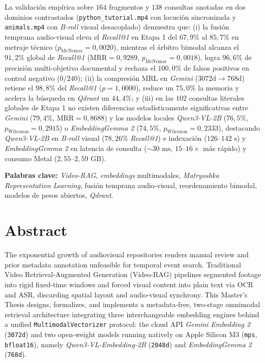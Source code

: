La validación empírica sobre $164$ fragmentos y $138$ consultas anotadas en dos dominios contrastados (\texttt{python\_tutorial.mp4} con locución sincronizada y \texttt{animals.mp4} con \textit{B-roll} visual desacoplado) demuestra que: (i) la fusión temprana audio-visual eleva el \textit{Recall@1} en Etapa 1 del $67,9\%$ al $85,7\%$ en metraje técnico ($p_{\text{McNemar}} = 0,0020$), mientras el árbitro bimodal alcanza el $91,2\%$ global de \textit{Recall@1} ($\text{MRR} = 0,9289$, $p_{\text{McNemar}} = 0,0018$), logra $96,6\%$ de precisión multi-objetivo documental y rechaza el $100,0\%$ de falsos positivos en control negativo ($0/240$); (ii) la compresión MRL en \textit{Gemini} ($3072\text{d} \to 768\text{d}$) retiene el $98,8\%$ del \textit{Recall@1} ($p = 1,0000$), reduce un $75,0\%$ la memoria y acelera la búsqueda en \textit{Qdrant} un $44,4\%$; y (iii) en las $102$ consultas literales globales de Etapa 1 no existen diferencias estadísticamente significativas entre \textit{Gemini} ($79,4\%$, $\text{MRR} = 0,8688$) y los modelos locales \textit{Qwen3-VL-2B} ($76,5\%$, $p_{\text{Wilcoxon}} = 0,2915$) o \textit{EmbeddingGemma 2} ($74,5\%$, $p_{\text{Wilcoxon}} = 0,2333$), destacando \textit{Qwen3-VL-2B} en \textit{B-roll} visual ($78,26\%$ \textit{Recall@1}) e indexación ($126$--$142\text{ s}$) y \textit{EmbeddingGemma 2} en latencia de consulta ($\sim 30\text{ ms}$, $15$--$16\times$ más rápido) y consumo Metal ($2,55$--$2,59\text{ GB}$).

\vspace{1em}
\noindent\textbf{Palabras clave:} \textit{Video-RAG}, \textit{embeddings} multimodales, \textit{Matryoshka Representation Learning}, fusión temprana audio-visual, reordenamiento bimodal, modelos de pesos abiertos, \textit{Qdrant}.

\clearpage
\thispagestyle{no-rightmark}
\section*{Abstract}

The exponential growth of audiovisual repositories renders manual review and prior metadata annotation unfeasible for temporal event search. Traditional Video Retrieval-Augmented Generation (Video-RAG) pipelines segmented footage into rigid fixed-time windows and forced visual content into plain text via OCR and ASR, discarding spatial layout and audio-visual synchrony. This Master's Thesis designs, formalizes, and implements a metadata-free, two-stage omnimodal retrieval architecture integrating three interchangeable embedding engines behind a unified \texttt{MultimodalVectorizer} protocol: the cloud API \textit{Gemini Embedding 2} (\texttt{3072d}) and two open-weight models running natively on Apple Silicon M3 (\texttt{mps}, \texttt{bfloat16}), namely \textit{Qwen3-VL-Embedding-2B} (\texttt{2048d}) and \textit{EmbeddingGemma 2} (\texttt{768d}).

